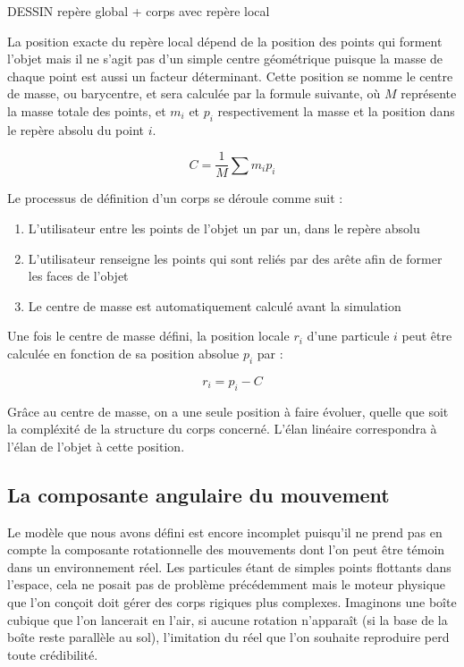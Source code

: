 DESSIN repère global + corps avec repère local

La position exacte du repère local dépend de la position des points qui forment l'objet mais il ne s'agit pas d'un simple centre géométrique puisque la masse de chaque point est aussi un facteur déterminant. Cette position se nomme le centre de masse, ou barycentre, et sera calculée par la formule suivante, o\`u $M$ représente la masse totale des points, et $m_i$ et $p_i$ respectivement la masse et la position dans le repère absolu du point $i$.

\[C = \frac{1}{M} \sum m_i p_i\]

Le processus de définition d'un corps se déroule comme suit :
\begin{enumerate}
  \item{L'utilisateur entre les points de l'objet un par un, dans le repère absolu}
  \item{L'utilisateur renseigne les points qui sont reliés par des arête afin de former les faces de l'objet}
  \item{Le centre de masse est automatiquement calculé avant la simulation}
\end{enumerate}

Une fois le centre de masse défini, la position locale $r_i$ d'une particule $i$ peut être calculée en fonction de sa position absolue $p_i$ par :

\[r_i = p_i - C\]

Grâce au centre de masse, on a une seule position à faire évoluer, quelle que soit la compléxité de la structure du corps concerné. L'élan linéaire correspondra à l'élan de l'objet à cette position.

\subsection{La composante angulaire du mouvement}

Le modèle que nous avons défini est encore incomplet puisqu'il ne prend pas en compte la composante rotationnelle des mouvements dont l'on peut être témoin dans un environnement réel. Les particules étant de simples points flottants dans l'espace, cela ne posait pas de problème précédemment mais le moteur physique que l'on conçoit doit gérer des corps rigiques plus complexes. Imaginons une boîte cubique que l'on lancerait en l'air, si aucune rotation n'apparaît (si la base de la boîte reste parallèle au sol), l'imitation du réel que l'on souhaite reproduire perd toute crédibilité.

